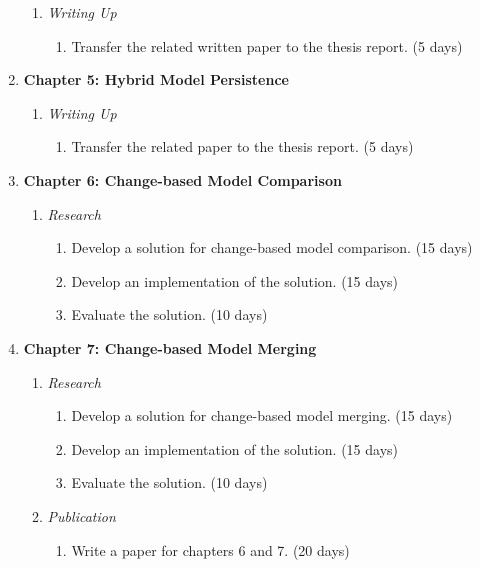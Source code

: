 \documentclass[12pt, a4paper]{report} \usepackage[titletoc]{appendix}
\begin{document}
\begin{enumerate}
    \begin{enumerate}
        \item \textit{Writing Up}
        \begin{enumerate}
            \item Transfer the related written paper to the thesis report. (5 days)
        \end{enumerate}
    \end{enumerate}
    \item \textbf{Chapter 5: Hybrid Model Persistence}
    \begin{enumerate}
        \item \textit{Writing Up}
        \begin{enumerate}
            \item Transfer the related paper to the thesis report. (5 days)
        \end{enumerate}
    \end{enumerate}
    \item \textbf{Chapter 6: Change-based Model Comparison}
    \begin{enumerate}
        \item \textit{Research}
        \begin{enumerate}
            \item Develop a solution for change-based model comparison. (15 days)
            \item Develop an implementation of the solution. (15 days)
            \item Evaluate the solution. (10 days)
        \end{enumerate}
    \end{enumerate}
    \item \textbf{Chapter 7: Change-based Model Merging}
    \begin{enumerate}
        \item \textit{Research}
        \begin{enumerate}
            \item Develop a solution for change-based model merging. (15 days)
            \item Develop an implementation of the solution. (15 days)
            \item Evaluate the solution. (10 days)
        \end{enumerate}
        \item \textit{Publication}
        \begin{enumerate}
            \item Write a paper for chapters 6 and 7. (20 days)

\end{enumerate}
\end{enumerate}
\end{enumerate}
\end{document}
